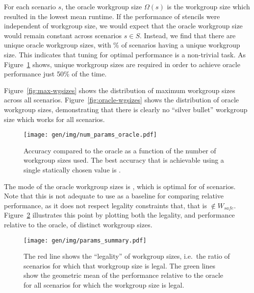 For each scenario $s$, the oracle workgroup size $\Omega(s)$ is the
workgroup size which resulted in the lowest mean runtime. If the
performance of stencils were independent of workgroup size, we would
expect that the oracle workgroup size would remain constant across
scenarios $s \in S$. Instead, we find that there are
 unique oracle workgroup sizes, with
\% of scenarios having a
unique workgroup size. This indicates that tuning for optimal
performance is a non-trivial task. As Figure~\ref{fig:oracle-accuracy}
shows,  unique workgroup sizes are
required in order to achieve oracle performance just 50\% of the time.

Figure~\ref{fig:max-wgsizes} shows the distribution of maximum
workgroup sizes across all scenarios. Figure~\ref{fig:oracle-wgsizes}
shows the distribution of oracle workgroup sizes, demonstrating that
there is clearly no ``silver bullet'' workgroup size which works for
all scenarios.

\begin{figure}
\centering
\texttt{[image: gen/img/num\_params\_oracle.pdf]}
\caption{%
  Accuracy compared to the oracle as a function of the number of
  workgroup sizes used. The best accuracy that is achievable using a
  single statically chosen value is
  \protect.%
}
\label{fig:oracle-accuracy}
\end{figure}

The mode of the oracle workgroup sizes is
, which is optimal for
 of scenarios. Note that this is
not adequate to use as a baseline for comparing relative performance,
as it does not respect legality constraints that, that is
$ \not\in W_{safe}$.
Figure~\ref{fig:performance-legality} illustrates this point by
plotting both the legality, and performance relative to the oracle, of
distinct workgroup sizes.


\begin{figure}
\centering
\texttt{[image: gen/img/params\_summary.pdf]}
\caption{%
  The red line shows the ``legality'' of workgroup sizes, i.e.\ the
  ratio of scenarios for which that workgroup size is legal.  The
  green lines show the geometric mean of the performance relative to
  the oracle for all scenarios for which the workgroup size is legal.%
}
\label{fig:performance-legality}
\end{figure}


